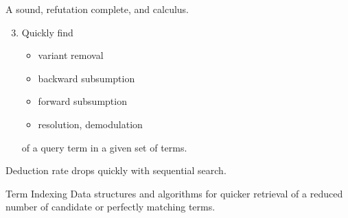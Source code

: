 

\begin{goal}
	A sound, refutation complete, and  calculus.\\[0.5em]
	\begin{enumerate}
		\setcounter{enumi}{2}
		\item Quickly find
\begin{itemize}

\item {} \hfill{\colG\footnotesize variant removal}
%

\item {}   \hfill{\colG\footnotesize backward subsumption}\\

\item {}  \hfill{\colG\footnotesize forward subsumption}\\

\item {} \hfill{\colG\footnotesize resolution, demodulation}\\

\end{itemize}
of a query term in a given set of terms.
\end{enumerate}

\end{goal}


	\begin{observation}
		Deduction rate drops quickly with sequential search.
	\end{observation}
	
	
	
	\begin{block}{Term Indexing}
		Data structures and algorithms for quicker retrieval of a reduced number of candidate or perfectly matching terms.
	\end{block}